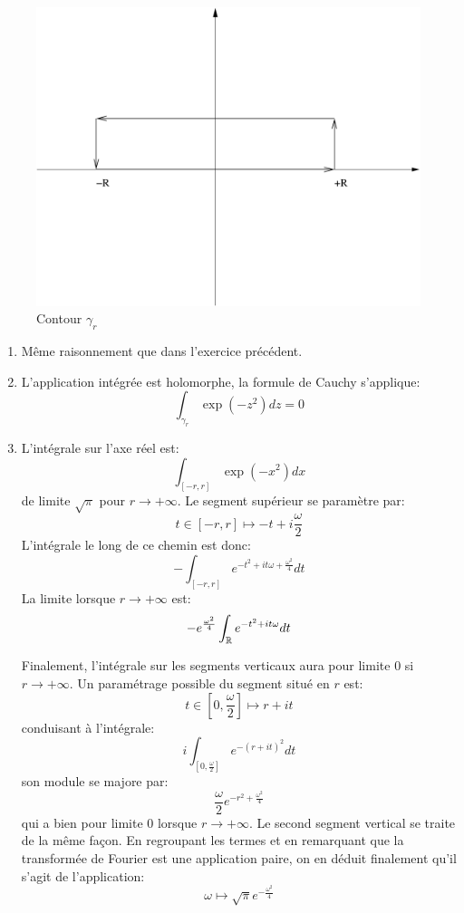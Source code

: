 \documentclass[a4paper, 12pt]{amsart}
\begin{document}
 \begin{figure}[ht]
\includegraphics[scale=0.3]{images/contour_gauss.pdf}
\caption{Contour $\gamma_r$}\label{fig:contour3}
\end{figure}
\begin{enumerate}
 \item Même raisonnement que dans l'exercice précédent.
\item L'application intégrée est holomorphe, la formule de Cauchy s'applique:
\[
  \int_{\gamma_r} \exp(-z^2)dz = 0
  \]
\item L'intégrale sur l'axe réel est:
\[
 \int_{[-r,r]} \exp(-x^2) dx 
\]
de limite $\sqrt{\pi}$ pour $r \to +\infty$. Le segment supérieur se paramètre
par:
\[
 t \in [-r,r] \mapsto -t+i \frac{\omega}{2}
\]
L'intégrale le long de ce chemin est donc:
\[
 - \int_{[-r,r]} e^{-t^2 + i t \omega + \frac{\omega^2}{4}} dt
\]
La limite lorsque $r\to +\infty$ est:
\[
- e^{\frac{\omega^2}{4}} \int_{\mathbb{R}}  e^{-t^2 + i t \omega} dt 
\]

Finalement, l'intégrale sur les segments verticaux aura pour limite $0$ si $r
\to +\infty$. Un paramétrage possible du segment situé en $r$ est:
\[
t \in [0, \frac{\omega}{2}] \mapsto r + it 
\]
conduisant à l'intégrale:
\[
 i \int_{[0, \frac{\omega}{2}]} e^{-(r+it)^2} dt 
\]
son module se majore par:
\[
 \frac{\omega}{2}e^{-r^2 + \frac{\omega^2}{4}}
\]
qui a bien pour limite $0$ lorsque $r \to +\infty$. Le second segment vertical
se traite de la même façon. En regroupant les termes et en remarquant que la
transformée de Fourier est une application paire, on en déduit finalement
qu'il s'agit de l'application:
\[
 \omega \mapsto \sqrt{\pi} e^{-\frac{\omega^2}{4}}
\]
\end{enumerate}
\end{document}
